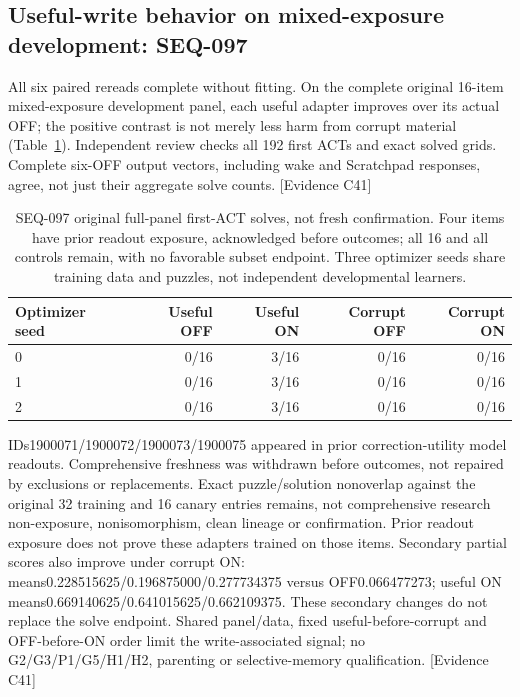 \documentclass[11pt]{article}
\newcommand{\ev}[1]{\textsf{[Evidence #1]}}
\begin{document}
\subsection{Useful-write behavior on mixed-exposure development: SEQ-097}
All six paired rereads complete without fitting. On the complete original
16-item mixed-exposure development panel, each useful adapter improves over
its actual OFF; the positive contrast is not merely less harm from corrupt
material (Table~\ref{tab:behavior097}). Independent review checks all 192 first
ACTs and exact solved grids. Complete six-OFF output vectors, including wake
and Scratchpad responses, agree, not just their aggregate solve counts. \ev{C41}

\begin{table}[htbp]
\centering
\begin{tabular}{lrrrr}
\toprule
Optimizer seed & Useful OFF & Useful ON & Corrupt OFF & Corrupt ON \\
\midrule
0 & 0/16 & 3/16 & 0/16 & 0/16 \\
1 & 0/16 & 3/16 & 0/16 & 0/16 \\
2 & 0/16 & 3/16 & 0/16 & 0/16 \\
\bottomrule
\end{tabular}
\caption{SEQ-097 original full-panel first-ACT solves, not fresh confirmation.
Four items have prior readout exposure, acknowledged before outcomes; all 16
and all controls remain, with no favorable subset endpoint. Three optimizer
seeds share training data and puzzles, not independent developmental learners.}
\label{tab:behavior097}
\end{table}

IDs1900071/1900072/1900073/1900075 appeared in prior correction-utility model
readouts. Comprehensive freshness was withdrawn before outcomes, not repaired
by exclusions or replacements. Exact puzzle/solution nonoverlap against the
original 32 training and 16 canary entries remains, not comprehensive research
non-exposure, nonisomorphism, clean lineage or confirmation. Prior readout
exposure does not prove these adapters trained on those items. Secondary partial
scores also improve under corrupt ON: means0.228515625/0.196875000/0.277734375
versus OFF0.066477273; useful ON means0.669140625/0.641015625/0.662109375.
These secondary changes do not replace the solve endpoint. Shared panel/data,
fixed useful-before-corrupt and OFF-before-ON order limit the write-associated
signal; no G2/G3/P1/G5/H1/H2, parenting or selective-memory qualification. \ev{C41}
\end{document}
